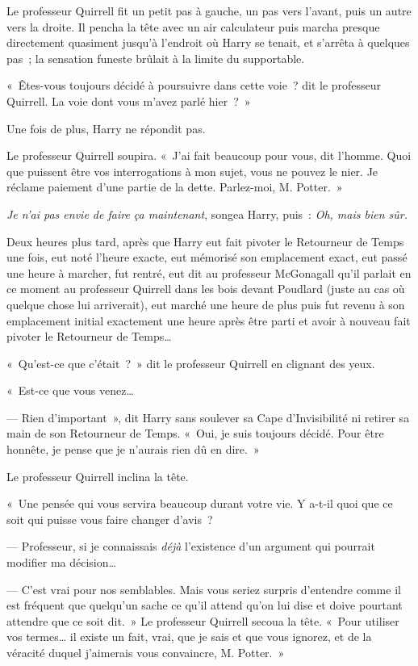 Le professeur Quirrell fit un petit pas à gauche, un pas vers l'avant, puis un autre vers la droite. Il pencha la tête avec un air calculateur puis marcha presque directement quasiment jusqu'à l'endroit où Harry se tenait, et s'arrêta à quelques pas~; la sensation funeste brûlait à la limite du supportable.

«~Êtes-vous toujours décidé à poursuivre dans cette voie~? dit le professeur Quirrell. La voie dont vous m'avez parlé hier~?~»

Une fois de plus, Harry ne répondit pas.

Le professeur Quirrell soupira. «~J'ai fait beaucoup pour vous, dit l'homme. Quoi que puissent être vos interrogations à mon sujet, vous ne pouvez le nier. Je réclame paiement d'une partie de la dette. Parlez-moi, M. Potter.~»

\emph{Je n'ai pas envie de faire ça maintenant}, songea Harry, puis~: \emph{Oh, mais bien sûr.}

\later

Deux heures plus tard, après que Harry eut fait pivoter le Retourneur de Temps une fois, eut noté l'heure exacte, eut mémorisé son emplacement exact, eut passé une heure à marcher, fut rentré, eut dit au professeur McGonagall qu'il parlait en ce moment au professeur Quirrell dans les bois devant Poudlard (juste au cas où quelque chose lui arriverait), eut marché une heure de plus puis fut revenu à son emplacement initial exactement une heure après être parti et avoir à nouveau fait pivoter le Retourneur de Temps…

\later

«~Qu'est-ce que c'était~?~» dit le professeur Quirrell en clignant des yeux.

«~Est-ce que vous venez…

--- Rien d'important~», dit Harry sans soulever sa Cape d'Invisibilité ni retirer sa main de son Retourneur de Temps. «~Oui, je suis toujours décidé. Pour être honnête, je pense que je n'aurais rien dû en dire.~»

Le professeur Quirrell inclina la tête.

«~Une pensée qui vous servira beaucoup durant votre vie. Y a-t-il quoi que ce soit qui puisse vous faire changer d'avis~?

--- Professeur, si je connaissais \emph{déjà} l'existence d'un argument qui pourrait modifier ma décision…

--- C'est vrai pour nos semblables. Mais vous seriez surpris d'entendre comme il est fréquent que quelqu'un sache ce qu'il attend qu'on lui dise et doive pourtant attendre que ce soit dit.~» Le professeur Quirrell secoua la tête. «~Pour utiliser vos termes… il existe un fait, vrai, que je sais et que vous ignorez, et de la véracité duquel j'aimerais vous convaincre, M. Potter.~»

